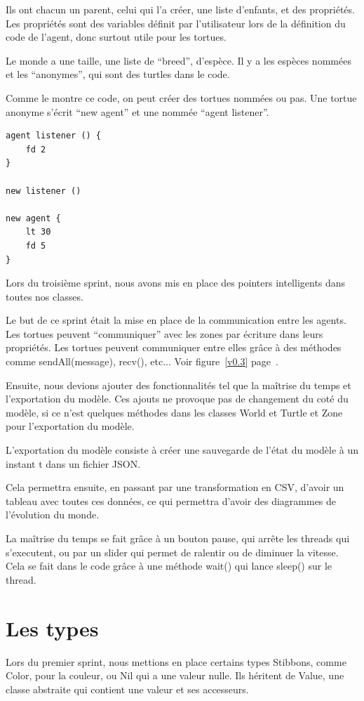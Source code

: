  
Ils ont chacun un parent, celui qui l'a créer, une liste d'enfants, et des propriétés. Les propriétés sont des variables définit par l'utilisateur lors de la définition du code de l'agent, donc surtout utile pour les tortues.


Le monde a une taille, une liste de \enquote{breed}, d'espèce. Il y a les espèces nommées et les \enquote{anonymes}, qui sont des turtles dans le code.


Comme le montre ce code, on peut créer des tortues nommées ou pas. Une tortue anonyme s'écrit \enquote{new agent} et une nommée \enquote{agent listener}.\\


\begin{lstlisting}
agent listener () {
	fd 2
}

new listener ()

new agent {
	lt 30
	fd 5
}
\end{lstlisting}
Lors du troisième sprint, nous avons mis en place des pointers intelligents dans toutes nos classes.


Le but de ce sprint était la mise en place de la communication entre les agents. Les tortues peuvent \enquote{communiquer} avec les zones par écriture dans leurs propriétés. Les tortues peuvent communiquer entre elles grâce à des méthodes comme sendAll(message), recv(), etc...
Voir figure~\ref{v0.3} page~\pageref{v0.3}.


Ensuite, nous devions ajouter des fonctionnalités tel que la maîtrise du temps et l'exportation du modèle. Ces ajouts ne provoque pas de changement du coté du modèle, si ce n'est quelques méthodes dans les classes World et Turtle et Zone pour l'exportation du modèle.


L'exportation du modèle consiste à créer une sauvegarde de l'état du modèle à un instant t dans un fichier JSON.


Cela permettra ensuite, en passant par une transformation en CSV, d'avoir un tableau avec toutes ces données, ce qui permettra d'avoir des diagrammes de l'évolution du monde.



La maîtrise du temps se fait grâce à un bouton pause, qui arrête les threads qui s'executent, ou par un slider qui permet de ralentir ou de diminuer la vitesse. Cela se fait dans le code grâce à une méthode wait() qui lance sleep() sur le thread.


\section{Les types}
Lors du premier sprint, nous mettions en place certains types Stibbons, comme Color, pour la couleur, ou Nil qui a une valeur nulle. Ils héritent de Value, une classe abstraite qui contient une valeur et ses accesseurs.


